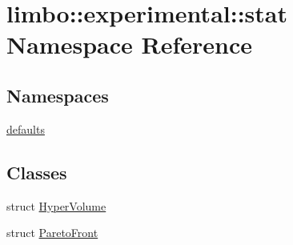 \hypertarget{namespacelimbo_1_1experimental_1_1stat}{}\section{limbo\+:\+:experimental\+:\+:stat Namespace Reference}
\label{namespacelimbo_1_1experimental_1_1stat}
\subsection*{Namespaces}
\begin{DoxyCompactItemize}
\item 
 \hyperlink{namespacelimbo_1_1experimental_1_1stat_1_1defaults}{defaults}
\end{DoxyCompactItemize}
\subsection*{Classes}
\begin{DoxyCompactItemize}
\item 
struct \hyperlink{structlimbo_1_1experimental_1_1stat_1_1_hyper_volume}{Hyper\+Volume}
\item 
struct \hyperlink{structlimbo_1_1experimental_1_1stat_1_1_pareto_front}{Pareto\+Front}
\end{DoxyCompactItemize}
